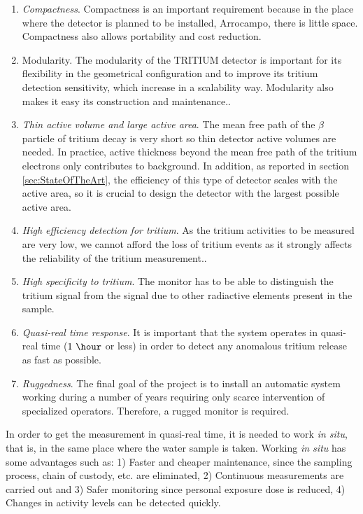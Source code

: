 \begin{enumerate}

\item{} \textit{Compactness}. Compactness is an important requirement because in the place where the detector is planned to be installed, Arrocampo, there is little space. Compactness also allows portability and cost reduction.

\item{Modularity}. The modularity of the TRITIUM detector is important for its flexibility in the geometrical configuration and to improve its tritium detection sensitivity, which increase in a scalability way. Modularity also makes it easy its construction and maintenance..

\item{} \textit{Thin active volume and large active area}. The mean free path of the $\beta$ particle of tritium decay is very short so thin detector active volumes are needed. In practice, active thickness beyond the mean free path of the tritium electrons only contributes to background. In addition, as reported in section \ref{sec:StateOfTheArt}, the efficiency of this type of detector scales with the active area, so it is crucial to design the detector with the largest possible active area.

\item{} \textit{High efficiency detection for tritium}. As the tritium activities to be measured are very low, we cannot afford the loss of tritium events as it strongly affects the reliability of the tritium measurement..

\item{} \textit{High specificity to tritium}. The monitor has to be able to distinguish the tritium signal from the signal due to other radiactive elements present in the sample.

\item{} \textit{Quasi-real time response}. It is important that the system operates in quasi-real time ($1~\hour$ or less) in order to detect any anomalous tritium release as fast as possible. 

\item{} \textit{Ruggedness}. The final goal of the project is to install an automatic system working during a number of years requiring only scarce intervention of specialized operators. Therefore, a rugged monitor is required.

\end{enumerate}

In order to get the measurement in quasi-real time, it is needed to work \textit{in situ}, that is, in the same place where the water sample is taken. Working \textit{in situ} has some advantages such as: 1) Faster and cheaper maintenance, since the sampling process, chain of custody, etc. are eliminated, 2) Continuous measurements are carried out and 3) Safer monitoring since personal exposure dose is reduced, 4) Changes in activity levels can be detected quickly.


